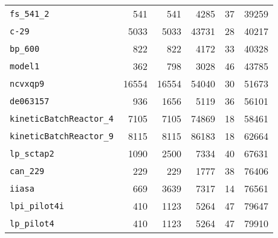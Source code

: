 \begin{table*}[p]
\begin{center}
\begin{tabular}{lrrrrr}
\texttt{fs\_541\_2}&541&541&4285&37&39259\\
\texttt{c-29}&5033&5033&43731&28&40217\\
\texttt{bp\_600}&822&822&4172&33&40328\\
\texttt{model1}&362&798&3028&46&43785\\
\texttt{ncvxqp9}&16554&16554&54040&30&51673\\
\texttt{de063157}&936&1656&5119&36&56101\\
\texttt{kineticBatchReactor\_4}&7105&7105&74869&18&58461\\
\texttt{kineticBatchReactor\_9}&8115&8115&86183&18&62664\\
\texttt{lp\_sctap2}&1090&2500&7334&40&67631\\
\texttt{can\_229}&229&229&1777&38&76406\\
\texttt{iiasa}&669&3639&7317&14&76561\\
\texttt{lpi\_pilot4i}&410&1123&5264&47&79647\\
\texttt{lp\_pilot4}&410&1123&5264&47&79910\\
\hline
\end{tabular}
\end{center}
\end{table*}

